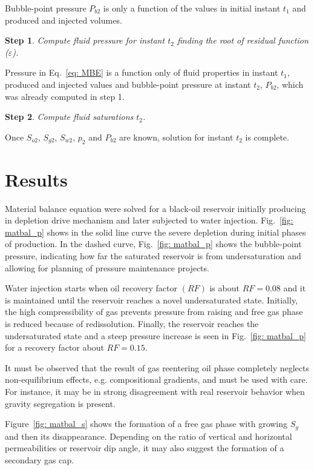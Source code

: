 \documentclass[authoryear,preprint,review,11pt]{elsarticle}
\newtheorem{step}{Step}
\begin{document}
Bubble-point pressure $P_{b2}$ is only a function of the values in initial instant $t_1$ and produced and injected volumes.

\begin{step}
Compute fluid pressure for instant $t_2$ finding the root of residual function ($\varepsilon$).
\end{step}

Pressure in Eq.~\eqref{eq: MBE} is a function only of fluid properties in instant $t_1$, produced and injected values and bubble-point pressure at instant $t_2$, $P_{b2}$, which was already computed in step 1.

\begin{step}
Compute fluid saturations $t_2$.
\end{step}

Once $S_{o2}$, $S_{g2}$, $S_{w2}$, $p_2$ and $P_{b2}$ are known, solution for instant $t_2$ is complete.

\section{Results}
Material balance equation were solved for a black-oil reservoir initially producing in depletion drive mechanism and later subjected to water injection. Fig.~\ref{fig: matbal_p} shows in the solid line curve the severe depletion during initial phases of production. In the dashed curve, Fig.~\ref{fig: matbal_p} shows the bubble-point pressure, indicating how far the saturated reservoir is from undersaturation and allowing for planning of pressure maintenance projects.


Water injection starts when oil recovery factor $(RF)$ is about $RF=0.08$ and it is maintained until the reservoir reaches a novel undersaturated state. Initially, the high compressibility of gas prevents pressure from raising and free gas phase is reduced because of redissolution. Finally, the reservoir reaches the undersaturated state and a steep pressure increase is seen in Fig.~\ref{fig: matbal_p} for a recovery factor about $RF=0.15$.

It must be observed that the result of gas reentering oil phase completely neglects non-equilibrium effects, e.g. compositional gradients, and must be used with care. For instance, it may be in strong disagreement with real reservoir behavior when gravity segregation is present.

Figure~\ref{fig: matbal_s} shows the formation of a free gas phase with growing $S_g$ and then its disappearance. Depending on the ratio of vertical and horizontal permeabilities or reservoir dip angle, it may also suggest the formation of a secondary gas cap.
\end{document}
